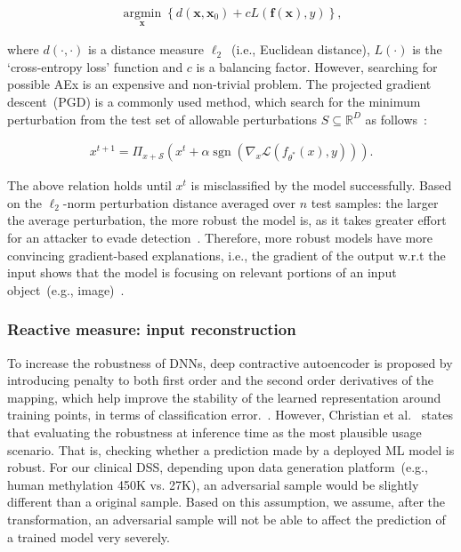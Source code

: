 \vspace{-6mm}
\begin{align}
    \underset{\boldsymbol{x}}{\operatorname{argmin}}\left\{d\left(\boldsymbol{x}, \boldsymbol{x}_{0}\right)+c {L}(\boldsymbol{f}(\boldsymbol{x}), y)\right\},
\end{align}

\hspace*{3.5mm} where $d(\cdot, \cdot)$ is a distance measure $\ell_{2}$~(i.e., Euclidean distance), ${L}(\cdot)$ is the `cross-entropy loss' function and $c$ is a balancing factor. However, searching for possible AEx is an expensive and non-trivial problem. The projected gradient descent~(PGD) is a commonly used method, which search for the minimum perturbation from the test set of allowable perturbations ${S} \subseteq \mathbb{R}^{D}$ as follows~\cite{bhatt2020explainable}: 

\vspace{-6mm}
\begin{align}
    x^{t+1}=\Pi_{x+\mathcal{S}}\left(x^{t}+\alpha \operatorname{sgn}\left(\nabla_{x} \mathcal{L}\left(f_{\theta^{*}}(x), y\right)\right)\right).
    \label{eq:search_perbu}
\end{align}

\hspace*{3.5mm} The above relation holds until $x^{t}$ is misclassified by the model successfully. Based on the $\ell_{2}$-norm perturbation distance averaged over $n$ test samples: the larger the average perturbation, the more robust the model is, as it takes greater effort for an attacker to evade detection~\cite{bhatt2020explainable,yuan2019adversarial}. 
Therefore, more robust models have more convincing gradient-based explanations, i.e., the gradient of the output w.r.t the input shows that the model is focusing on relevant portions of an input object~(e.g., image)~\cite{bhatt2020explainable}.

\subsubsection{Reactive measure: input reconstruction}
To increase the robustness of DNNs, deep contractive autoencoder is proposed by introducing penalty to both first order and the second order derivatives of the mapping, which help improve the stability of the learned representation around training points, in terms of classification error.~\cite{rifai2011higher}.
However, Christian et al.~\cite{RobustnessNotEnough} states that evaluating the robustness at inference time as the most plausible usage scenario. That is, checking whether a prediction made by a deployed ML model is robust. 
For our clinical DSS, depending upon data generation platform~(e.g., human methylation 450K vs. 27K), an adversarial sample would be slightly different than a original sample. Based on this assumption, we assume, after the transformation, an adversarial sample will not be able to affect the prediction of a trained model very severely. 

